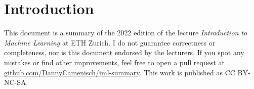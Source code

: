 \section{Introduction}

This document is a summary of the 2022 edition of the lecture \textit{Introduction to Machine Learning} at ETH Zurich. I do not guarantee correctness or completeness, nor is this document endorsed by the lecturers. If you spot any mistakes or find other improvements, feel free to open a pull request at \href{https://github.com/DannyCamenisch/iml-summary}{github.com/DannyCamenisch/iml-summary}. This work is published as CC BY-NC-SA.
\begin{center}
	\ccbyncsa
\end{center}
